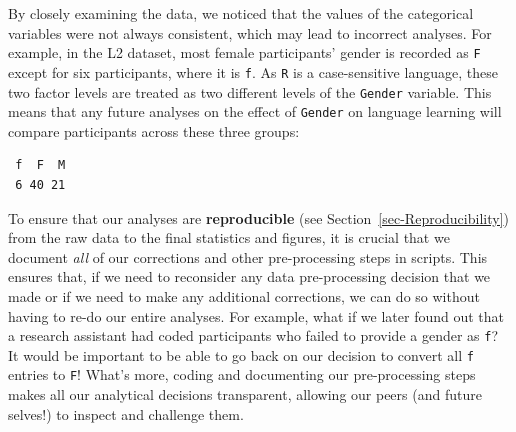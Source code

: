 \documentclass[
  letterpaper,
  DIV=11,
  numbers=noendperiod]{scrreprt}
\newenvironment{Shaded}{\begin{snugshade}}{\end{snugshade}}
\newcommand{\FunctionTok}[1]{\textcolor[rgb]{0.28,0.35,0.67}{#1}}
\newcommand{\NormalTok}[1]{\textcolor[rgb]{0.00,0.23,0.31}{#1}}
\newcommand{\SpecialCharTok}[1]{\textcolor[rgb]{0.37,0.37,0.37}{#1}}
\begin{document}
By closely examining the data, we noticed that the values of the
categorical variables were not always consistent, which may lead to
incorrect analyses. For example, in the L2 dataset, most female
participants' gender is recorded as \texttt{F} except for six
participants, where it is \texttt{f}. As \texttt{R} is a case-sensitive
language, these two factor levels are treated as two different levels of
the \texttt{Gender} variable. This means that any future analyses on the
effect of \texttt{Gender} on language learning will compare participants
across these three groups:

\begin{Shaded}
\end{Shaded}

\begin{verbatim}
 f  F  M 
 6 40 21 
\end{verbatim}

\begin{tcolorbox}[enhanced jigsaw, arc=.35mm, bottomrule=.15mm, bottomtitle=1mm, breakable, colback=white, colbacktitle=quarto-callout-important-color!10!white, colframe=quarto-callout-important-color-frame, coltitle=black, left=2mm, leftrule=.75mm, opacityback=0, opacitybacktitle=0.6, rightrule=.15mm, title=\textcolor{quarto-callout-important-color}{\faExclamation}\hspace{0.5em}{Be kind to your future self!}, titlerule=0mm, toprule=.15mm, toptitle=1mm]

To ensure that our analyses are \textbf{reproducible} (see
Section~\ref{sec-Reproducibility}) from the raw data to the final
statistics and figures, it is crucial that we document \emph{all} of our
corrections and other pre-processing steps in scripts. This ensures
that, if we need to reconsider any data pre-processing decision that we
made or if we need to make any additional corrections, we can do so
without having to re-do our entire analyses. For example, what if we
later found out that a research assistant had coded participants who
failed to provide a gender as \texttt{f}? It would be important to be
able to go back on our decision to convert all \texttt{f} entries to
\texttt{F}! What's more, coding and documenting our pre-processing steps
makes all our analytical decisions transparent, allowing our peers (and
future selves!) to inspect and challenge them.

\end{tcolorbox}
\end{document}
